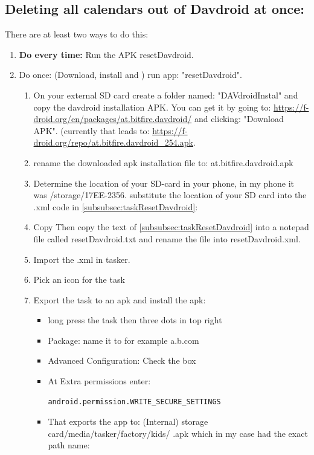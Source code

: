 \subsection{Deleting all calendars out of Davdroid at once:}
There are at least two ways to do this:
\begin{enumerate}
    \item \textbf{Do every time:} Run the APK resetDavdroid.
    \item Do once: (Download, install and ) run app: "resetDavdroid".
    \begin{enumerate}
        \item On your external SD card create a folder named: "DAVdroidInstal" and copy the davdroid installation APK. You can get it by going to: \url{https://f-droid.org/en/packages/at.bitfire.davdroid/} and clicking: "Download APK". (currently that leads to: \url{https://f-droid.org/repo/at.bitfire.davdroid_254.apk}.
        \item rename the downloaded apk installation file to: at.bitfire.davdroid.apk
        \item Determine the location of your SD-card in your phone, in my phone it was /storage/17EE-2356. substitute the location of your SD card into the .xml code in \cref{subsubsec:taskResetDavdroid}:
        \item Copy Then copy the text of \cref{subsubsec:taskResetDavdroid} into a notepad file called resetDavdroid.txt and rename the file into resetDavdroid.xml.
        \item Import the .xml in tasker.
        \item Pick an icon for the task
        \item Export the task to an apk and install the apk:
        \begin{itemize}
            \item long press the task then three dots in top right 
            \item Package: name it to for example a.b.com
            \item Advanced Configuration: Check the box
            \item At Extra permissions enter:
\begin{verbatim}
android.permission.WRITE_SECURE_SETTINGS
\end{verbatim}
            \item That exports the app to: (Internal) storage card/media/tasker/factory/kids/ 
 .apk which in my case had the exact path name:
\begin{verbatim}

\end{verbatim}
\end{itemize}
\end{enumerate}
\end{enumerate}
